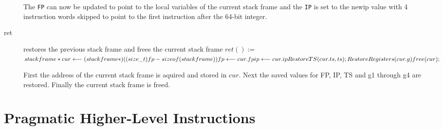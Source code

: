 \documentclass[english,a4paper,12pt]{report}
\begin{document}
\begin{description}
	The \verb|FP| can now be updated to point to the local variables 
	of
	the current stack frame and the \verb|IP| is set to the newip 
	value
	with 4 instruction words skipped to point to the first instruction
	after the 64-bit integer.
	
	\item[ret] restores the previous stack frame and frees the current
	stack frame
	$ret() := $  \\
	$ stackframe *cur \longleftarrow (stackframe*)((size\_t)fp - 
	sizeof(stackframe)) \\
	fp \longleftarrow cur.fp \\
	ip \longleftarrow cur.ip \\
	RestoreTS(cur.ts, ts);\\
	RestoreRegisters(cur.g) \\
	free(cur); \\$
	
	First the address of the current stack frame is aquired and stored
	in $cur$.
	Next the saved values for FP, IP, TS and g1 through g4 are 
	restored.
	Finally the current stack frame is freed.
\end{description}

\section{Pragmatic Higher-Level Instructions}
\end{document}

